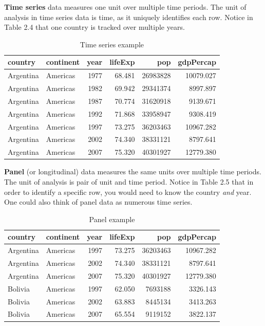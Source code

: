 \documentclass[
]{book}
\begin{document}
\textbf{Time series} data measures one unit over multiple time periods. The unit of analysis in time series data is time, as it uniquely identifies each row. Notice in Table 2.4 that one country is tracked over multiple years.

\begin{table}

\caption{\label{tab:timeseries}Time series example}
\centering
\begin{tabular}[t]{l|l|r|r|r|r}
\hline
country & continent & year & lifeExp & pop & gdpPercap\\
\hline
Argentina & Americas & 1977 & 68.481 & 26983828 & 10079.027\\
\hline
Argentina & Americas & 1982 & 69.942 & 29341374 & 8997.897\\
\hline
Argentina & Americas & 1987 & 70.774 & 31620918 & 9139.671\\
\hline
Argentina & Americas & 1992 & 71.868 & 33958947 & 9308.419\\
\hline
Argentina & Americas & 1997 & 73.275 & 36203463 & 10967.282\\
\hline
Argentina & Americas & 2002 & 74.340 & 38331121 & 8797.641\\
\hline
Argentina & Americas & 2007 & 75.320 & 40301927 & 12779.380\\
\hline
\end{tabular}
\end{table}

\textbf{Panel} (or longitudinal) data measures the same units over multiple time periods. The unit of analysis is pair of unit and time period. Notice in Table 2.5 that in order to identify a specific row, you would need to know the country \emph{and} year. One could also think of panel data as numerous time series.

\begin{table}

\caption{\label{tab:panel}Panel example}
\centering
\begin{tabular}[t]{l|l|r|r|r|r}
\hline
country & continent & year & lifeExp & pop & gdpPercap\\
\hline
Argentina & Americas & 1997 & 73.275 & 36203463 & 10967.282\\
\hline
Argentina & Americas & 2002 & 74.340 & 38331121 & 8797.641\\
\hline
Argentina & Americas & 2007 & 75.320 & 40301927 & 12779.380\\
\hline
Bolivia & Americas & 1997 & 62.050 & 7693188 & 3326.143\\
\hline
Bolivia & Americas & 2002 & 63.883 & 8445134 & 3413.263\\
\hline
Bolivia & Americas & 2007 & 65.554 & 9119152 & 3822.137\\
\hline
\end{tabular}
\end{table}
\end{document}
